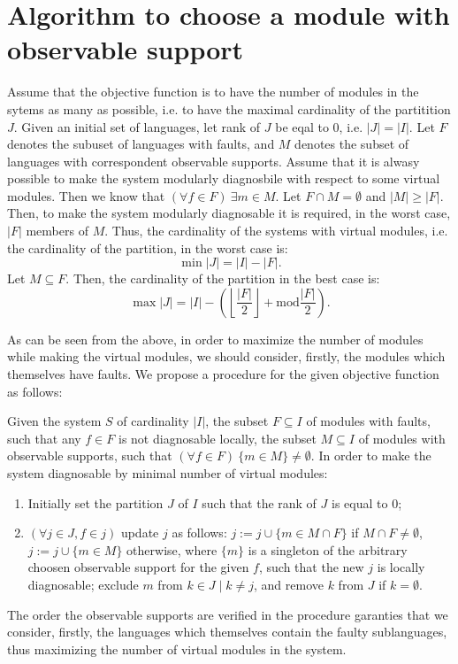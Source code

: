 \documentclass[a4paper, 10pt, conference]{ieeeconf}
\begin{document}
\section{Algorithm to choose a module with observable support}
Assume that the objective function is to have the number of modules in the
sytems as many as possible, i.e. to have the maximal cardinality of the
partitition $J$.
Given an initial set of languages, let rank of $J$ be eqal to 0, i.e. $|J| =
|I|$. Let $F$ denotes the subuset of languages with faults, and $M$ denotes the
subset of languages with correspondent observable supports.
Assume that it is alwasy possible to make the system modularly diagnosbile with
respect to some virtual modules. Then we know that $(\forall f \in F)~\exists m
\in M$. Let $F \cap M = \emptyset$ and $|M| \geq |F|$. Then, to make the system
modularly diagnosable it is required, in the worst case, $|F|$ members of $M$.
Thus, the cardinality of the systems with virtual modules, i.e. the cardinality
of the partition, in the worst case is:
\begin{equation}
	\min |J| = |I| - |F|.
\end{equation}
Let $M \subseteq F$. Then, the cardinality of the partition in the best case
is:
\begin{equation}
	\max |J| = |I| - \left(
		\left\lfloor \frac{|F|}{2} \right\rfloor + \textrm{mod} \frac{|F|}{2}
		\right). 
\end{equation}

As can be seen from the above, in order to maximize the number of modules while
making the virtual modules, we should consider, firstly, the modules which
themselves have faults. We propose a procedure for the given objective function
as follows:

Given the system $S$ of cardinality $|I|$, the subset $F
\subseteq I$ of modules with faults, such that any $f\in F$ is not diagnosable
locally, the subset $M \subseteq I$ of modules with observable supports, such
that $(\forall f \in F)~\{m \in M\}\neq \emptyset$. In order to make the system
diagnosable by minimal number of virtual modules: 
\begin{enumerate}
  \item Initially set the partition $J$ of $I$ such that the rank of $J$ is
  equal to 0;
  \item $(\forall j \in J, f \in j)$ update $j$ as follows: 
  	$j := j \cup \{m \in M \cap F\}$ if $M \cap F \neq \emptyset$,
 $j := j \cup \{m \in M\}$ otherwise, where $\{m\}$ is a singleton of the
 arbitrary choosen observable support for the given $f$, such that the new $j$
 is locally diagnosable; exclude $m$ from $k \in J \mid k \neq j$, and remove
 $k$ from $J$ if $k=\emptyset$.
\end{enumerate} 
The order the observable supports are verified in the procedure garanties that
we consider, firstly, the languages which themselves contain the faulty
sublanguages, thus maximizing the number of virtual modules in the system.
\end{document}
